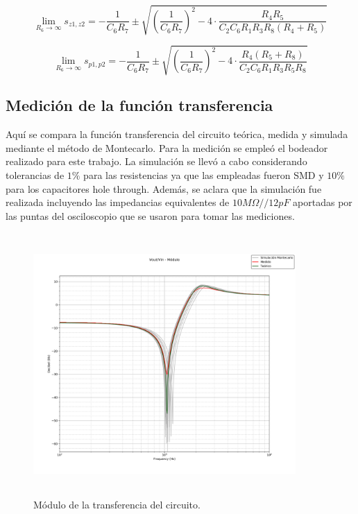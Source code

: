 \begin{equation}
\lim_{R_6\to\infty}s_{z1,z2} =  -\frac{1}{C_6 R_7} \pm \sqrt{\left(\frac{1}{C_6 R_7} \right)^2 - 4 \cdot \frac{R_4 R_5}{C_2 C_6 R_1 R_3 R_8(R_4 + R_5)}}
\end{equation}

\begin{equation}
\lim_{R_6\to\infty}s_{p1,p2} =  - \frac{1}{C_6 R_7} \pm \sqrt{\left(\frac{1}{C_6 R_7}\right)^2 - 4 \cdot \frac{R_4 (R_5 + R_8)}{C_2 C_6 R_1 R_3 R_5 R_8 }}
\end{equation}



\subsection{Medici\'on de la funci\'on transferencia}

Aqu\'i se compara la funci\'on transferencia del circuito te\'orica, 
medida y simulada mediante el m\'etodo de Montecarlo. Para la medici\'on se emple\'o el bodeador realizado para este trabajo. La simulaci\'on se llev\'o a cabo considerando tolerancias de $1\%$ para las resistencias ya que las empleadas fueron SMD y $10\%$ para los capacitores hole through. Adem\'as, se aclara que la simulaci\'on fue realizada incluyendo las impedancias equivalentes de $10M\Omega // 12pF$ aportadas por las puntas del osciloscopio que se usaron para tomar las mediciones.

\begin{figure}[H] %
	\centering
	\includegraphics[width=10cm,height=10cm,keepaspectratio]{../EJ1/00GRAFICOS/vovi.png}
	\caption{M\'odulo de la transferencia del circuito.}
	\label{vovi_mod}
\end{figure}

